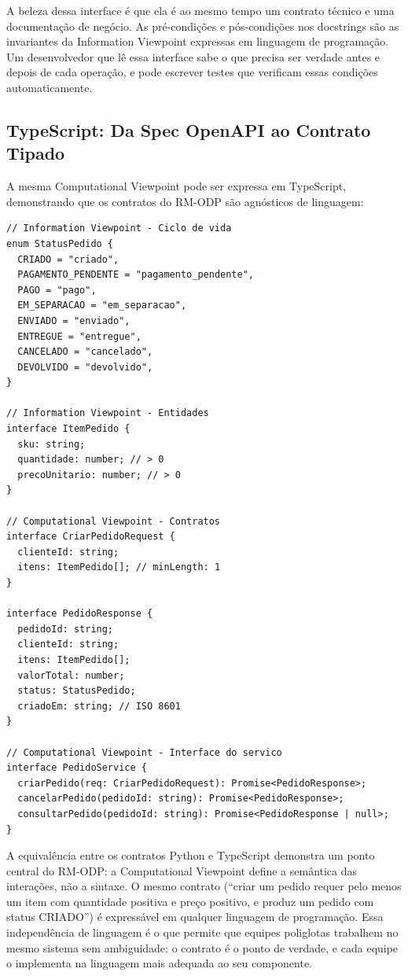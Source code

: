 A beleza dessa interface é que ela é ao mesmo tempo um contrato técnico e uma
documentação de negócio. As pré-condições e pós-condições nos docstrings são
as invariantes da Information Viewpoint expressas em linguagem de programação.
Um desenvolvedor que lê essa interface sabe o que precisa ser verdade
antes e depois de cada operação, e pode escrever testes que verificam essas
condições automaticamente.

\subsection{TypeScript: Da Spec OpenAPI ao Contrato Tipado}

A mesma Computational Viewpoint pode ser expressa em TypeScript, demonstrando que
os contratos do RM-ODP são agnósticos de linguagem:

\begin{lstlisting}[language={}, caption={Contratos TypeScript derivados do RM-ODP}]
// Information Viewpoint - Ciclo de vida
enum StatusPedido {
  CRIADO = "criado",
  PAGAMENTO_PENDENTE = "pagamento_pendente",
  PAGO = "pago",
  EM_SEPARACAO = "em_separacao",
  ENVIADO = "enviado",
  ENTREGUE = "entregue",
  CANCELADO = "cancelado",
  DEVOLVIDO = "devolvido",
}

// Information Viewpoint - Entidades
interface ItemPedido {
  sku: string;
  quantidade: number; // > 0
  precoUnitario: number; // > 0
}

// Computational Viewpoint - Contratos
interface CriarPedidoRequest {
  clienteId: string;
  itens: ItemPedido[]; // minLength: 1
}

interface PedidoResponse {
  pedidoId: string;
  clienteId: string;
  itens: ItemPedido[];
  valorTotal: number;
  status: StatusPedido;
  criadoEm: string; // ISO 8601
}

// Computational Viewpoint - Interface do servico
interface PedidoService {
  criarPedido(req: CriarPedidoRequest): Promise<PedidoResponse>;
  cancelarPedido(pedidoId: string): Promise<PedidoResponse>;
  consultarPedido(pedidoId: string): Promise<PedidoResponse | null>;
}
\end{lstlisting}

A equivalência entre os contratos Python e TypeScript demonstra um ponto central
do RM-ODP: a Computational Viewpoint define a semântica das interações, não a
sintaxe. O mesmo contrato (``criar um pedido requer pelo menos um item com
quantidade positiva e preço positivo, e produz um pedido com status CRIADO'')
é expressável em qualquer linguagem de programação. Essa independência de
linguagem é o que permite que equipes poliglotas trabalhem no mesmo sistema sem
ambiguidade: o contrato é o ponto de verdade, e cada equipe o implementa na
linguagem mais adequada ao seu componente.



